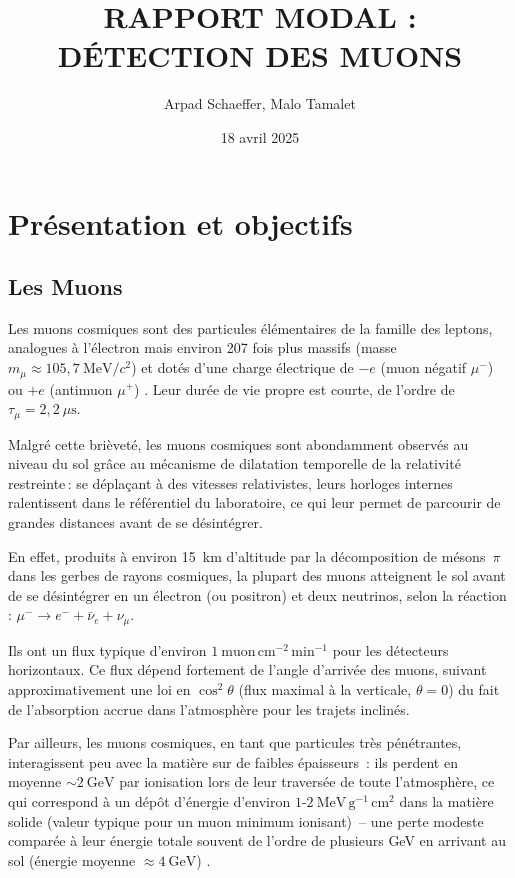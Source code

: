 \documentclass[a4paper,12pt,twoside]{article}
\title{RAPPORT MODAL :\\ DÉTECTION DES MUONS}
\author{Arpad Schaeffer, Malo Tamalet}
\date{18 avril 2025}
\begin{document}
\maketitle

\tableofcontents


\section{Présentation et objectifs}
\subsection{Les Muons}
Les muons cosmiques sont des particules élémentaires de la famille des leptons, analogues à l’électron mais environ 207 fois plus massifs (masse $m_\mu \approx 105{,}7\ \mathrm{MeV}/c^2$) et dotés d’une charge électrique de $-e$ (muon négatif $\mu^-$) ou $+e$ (antimuon $\mu^+$) \cite{wikimuon,knoll2010}. Leur durée de vie propre est courte, de l’ordre de $\tau_\mu = 2{,}2\ \mu\mathrm{s}$. 

Malgré cette brièveté, les muons cosmiques sont abondamment observés au niveau du sol grâce au mécanisme de dilatation temporelle de la relativité restreinte\,:
se déplaçant à des vitesses relativistes, leurs horloges internes \og ralentissent\fg{} dans le référentiel du laboratoire, ce qui leur permet de parcourir de grandes distances avant de se désintégrer.

En effet, produits à environ 15~km d’altitude par la décomposition de mésons~$\pi$ dans les gerbes de rayons cosmiques, la plupart des muons atteignent le sol avant de se désintégrer en un électron (ou positron) et deux neutrinos, selon la réaction : $\mu^- \to e^- + \bar{\nu}_e + \nu_\mu$.

Ils ont un flux typique d’environ $1\ \text{muon}\,\mathrm{cm^{-2}}\,\mathrm{min^{-1}}$
pour les détecteurs horizontaux. Ce flux dépend fortement de l’angle d’arrivée des muons, suivant approximativement une loi en $\cos^2\theta$ (flux maximal à la verticale, $\theta=0$) du fait de l’absorption accrue dans l’atmosphère pour les trajets inclinés.

Par ailleurs, les muons cosmiques, en tant que particules très pénétrantes, interagissent peu avec la matière sur de faibles épaisseurs : ils perdent en moyenne $\sim2\ \mathrm{GeV}$ par ionisation lors de leur traversée de toute l’atmosphère, ce qui correspond à un dépôt d’énergie d’environ $1\text{-}2\ \mathrm{MeV}\,\mathrm{g^{-1}}\,\mathrm{cm^2}$
dans la matière solide (valeur typique pour un muon minimum ionisant) – une perte modeste comparée à leur énergie totale souvent de l’ordre de plusieurs GeV en arrivant au sol (énergie moyenne $\approx4\ \mathrm{GeV}$) \cite{bethe1930}.
\newpage
\end{document}
